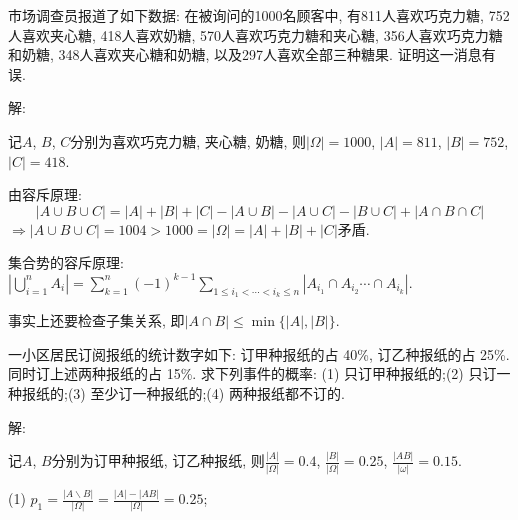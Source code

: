 \documentclass[standard]{ExBook}
\begin{document}
\begin{qitems}
\vspace{-5em}

    \begin{bbox}
    \begin{shaded}
        \qitem
市场调查员报道了如下数据: 在被询问的1000名顾客中, 有811人喜欢巧克力糖, 752人喜欢夹心糖, 418人喜欢奶糖, 570人喜欢巧克力糖和夹心糖, 356人喜欢巧克力糖和奶糖, 348人喜欢夹心糖和奶糖, 以及297人喜欢全部三种糖果. 证明这一消息有误.
    \end{shaded}
    \end{bbox}

\vspace{-5em}

    \begin{bbox}
解:

记$A$, $B$, $C$分别为喜欢巧克力糖, 夹心糖, 奶糖, 则$|\Omega|=1000$, $|A|=811$, $|B|=752$, $|C|=418$.

由容斥原理: 
$$|A\cup B\cup C|=|A|+|B|+|C|-|A\cup B|-|A\cup C|-|B\cup C|+|A\cap B\cap C|$$
$\Longrightarrow$$|A\cup B\cup C|=1004 > 1000=|\Omega|=|A|+|B|+|C|$矛盾.

\textcolor{themeColor}{\selectfont {} 集合势的容斥原理: $|\bigcup\limits_{i=1}^{n}A_{i}|=\sum\limits_{k=1}^{n}(-1)^{k-1}\sum\limits_{1\leq i_{1}<\cdots<i_{k}\leq n}|A_{i_{1}}\cap A_{i_{2}}\cdots\cap A_{i_{k}}|$.}

\textcolor{themeColor}{\selectfont {} 事实上还要检查子集关系, 即$|A\cap B|\leq\min\{|A|,|B|\}$.}
    \end{bbox}

\vspace{-5em}

    \begin{bbox}
    \begin{shaded}
        \qitem
一小区居民订阅报纸的统计数字如下: 订甲种报纸的占 40\%, 订乙种报纸的占 25\%. 同时订上述两种报纸的占 15\%. 求下列事件的概率: (1) 只订甲种报纸的;\qquad(2) 只订一种报纸的;\qquad(3) 至少订一种报纸的;\qquad(4) 两种报纸都不订的.
    \end{shaded}
    \end{bbox}

\vspace{-5em}

    \begin{bbox}
解: 

记$A$, $B$分别为订甲种报纸, 订乙种报纸, 则$\frac{|A|}{|\Omega|}=0.4$, $\frac{|B|}{|\Omega|}=0.25$, $\frac{|AB|}{|\omega|}=0.15$.

(1) $p_{1}=\frac{|A\backslash B|}{|\Omega|}=\frac{|A|-|AB|}{|\Omega|}=0.25$;


\end{bbox}
\end{qitems}
\end{document}
